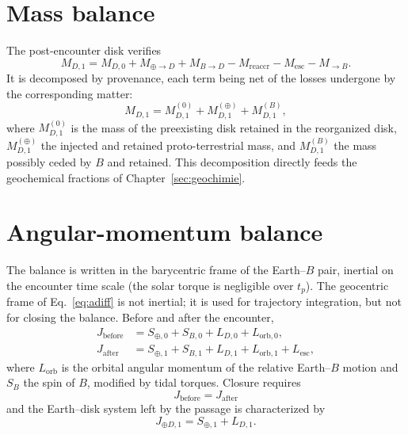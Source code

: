 \documentclass[11pt,a4paper,openany]{report}
\begin{document}
\section{Mass balance}

The post-encounter disk verifies
\begin{equation}
M_{D,1}=M_{D,0}+M_{\oplus\to D}+M_{B\to D}-M_{\mathrm{reaccr}}-M_{\mathrm{esc}}-M_{\to B}.
\label{eq:bilanM1}
\end{equation}
It is decomposed by provenance, each term being net of the losses undergone by the corresponding
matter:
\begin{equation}
M_{D,1}=M_{D,1}^{(0)}+M_{D,1}^{(\oplus)}+M_{D,1}^{(B)},
\label{eq:provenance}
\end{equation}
where $M_{D,1}^{(0)}$ is the mass of the preexisting disk retained in the reorganized disk,
$M_{D,1}^{(\oplus)}$ the injected and retained proto-terrestrial mass, and $M_{D,1}^{(B)}$ the mass
possibly ceded by $B$ and retained. This decomposition directly feeds the geochemical fractions of
Chapter~\ref{sec:geochimie}.

\section{Angular-momentum balance}

The balance is written in the barycentric frame of the Earth--$B$ pair, inertial on the encounter
time scale (the solar torque is negligible over $t_{p}$). The geocentric frame of
Eq.~\eqref{eq:adiff} is not inertial; it is used for trajectory integration, but not for closing the
balance. Before and after the encounter,
\begin{align}
J_{\mathrm{before}}&=S_{\oplus,0}+S_{B,0}+L_{D,0}+L_{\mathrm{orb},0},
\label{eq:Javant}\\
J_{\mathrm{after}}&=S_{\oplus,1}+S_{B,1}+L_{D,1}+L_{\mathrm{orb},1}+L_{\mathrm{esc}},
\label{eq:Japres}
\end{align}
where $L_{\mathrm{orb}}$ is the orbital angular momentum of the relative Earth--$B$ motion and $S_B$
the spin of $B$, modified by tidal torques. Closure requires
\begin{equation}
\boxed{\;J_{\mathrm{before}}=J_{\mathrm{after}}\;}
\label{eq:fermeture}
\end{equation}
and the Earth--disk system left by the passage is characterized by
\begin{equation}
J_{\oplus D,1}=S_{\oplus,1}+L_{D,1}.
\label{eq:J1}
\end{equation}
\end{document}
